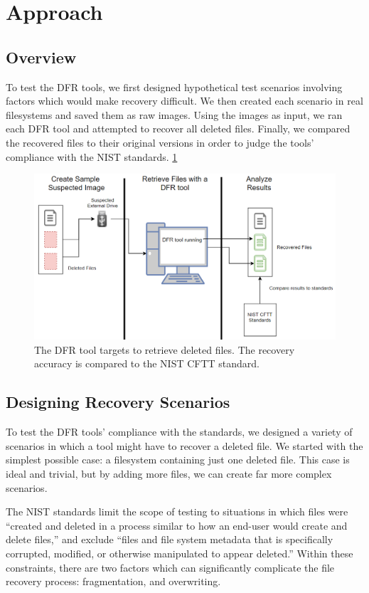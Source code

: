 \section{Approach}

\subsection{Overview}

To test the DFR tools, we first designed hypothetical test scenarios involving factors which would make recovery difficult. We then created each scenario in real filesystems and saved them as raw images. Using the images as input, we ran each DFR tool and attempted to recover all deleted files. Finally, we compared the recovered files to their original versions in order to judge the tools' compliance with the NIST standards.  \ref{fig:overview}

\begin{figure}[h]
    \centering
    \includegraphics[width=\linewidth]{fig/overview.png}
    \caption{The DFR tool targets to retrieve deleted files. The recovery accuracy is compared to the NIST CFTT standard.}
    \label{fig:overview}
\end{figure}

\subsection{Designing Recovery Scenarios}
To test the DFR tools' compliance with the standards, we designed a variety of scenarios in which a tool might have to recover a deleted file. We started with the simplest possible case: a filesystem containing just one deleted file. This case is ideal and trivial, but by adding more files, we can create far more complex scenarios.

The NIST standards limit the scope of testing to situations in which files were ``created and deleted in a process similar to how an end-user would create and delete files,''\cite{meta:dfr:standards} and  exclude ``files and file system metadata that is specifically corrupted, modified, or otherwise manipulated to appear deleted.''\cite{meta:dfr:standards}
Within these constraints, there are two factors which can significantly complicate the file recovery process: fragmentation, and overwriting. 

